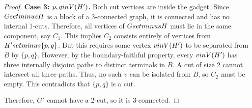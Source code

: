 \documentclass[12pt]{article}
\theoremstyle{definition}
\begin{document}
\begin{proof}
\textbf{Case 3: $p, q \\in V(H')$.}
Both cut vertices are inside the gadget. Since $G \\setminus H$ is a block of a 3-connected graph, it is connected and has no internal 1-cuts. Therefore, all vertices of $G \\setminus H$ must lie in the same component, say $C_1$. This implies $C_2$ consists entirely of vertices from $H' \\setminus \{p, q\}$. But this requires some vertex $v \\in V(H')$ to be separated from $B$ by $\{p, q\}$. However, by the boundary-faithful property, every $v \\in V(H')$ has three internally disjoint paths to distinct terminals in $B$. A cut of size 2 cannot intersect all three paths. Thus, no such $v$ can be isolated from $B$, so $C_2$ must be empty. This contradicts that $\{p, q\}$ is a cut.

Therefore, $G'$ cannot have a 2-cut, so it is 3-connected.
\end{proof}
\end{document}
